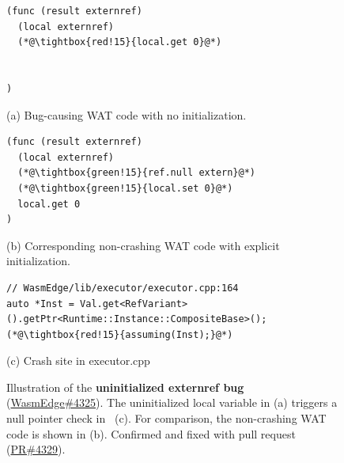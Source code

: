 \begin{figure}[t]
\centering
\begin{minipage}[t]{0.48\linewidth}
\lstset{style=watpaper}
\begin{lstlisting}
(func (result externref)
  (local externref)
  (*@\tightbox{red!15}{local.get 0}@*)

  
)
\end{lstlisting}
\centering\footnotesize{(a) Bug-causing WAT code with no  initialization.}
\end{minipage}\hfill
\begin{minipage}[t]{0.48\linewidth}
\lstset{style=watpaper}
\begin{lstlisting}
(func (result externref)
  (local externref)
  (*@\tightbox{green!15}{ref.null extern}@*)
  (*@\tightbox{green!15}{local.set 0}@*)
  local.get 0
)
\end{lstlisting}
\centering\footnotesize{(b) Corresponding non-crashing WAT code with explicit initialization.}
\end{minipage}

\vspace{6pt}

\begin{lstlisting}
// WasmEdge/lib/executor/executor.cpp:164
auto *Inst = Val.get<RefVariant>().getPtr<Runtime::Instance::CompositeBase>();
(*@\tightbox{red!15}{assuming(Inst);}@*)
\end{lstlisting}
\centering\footnotesize{(c) Crash site in executor.cpp}

\vspace{-4pt}
\caption{Illustration of the \textbf{uninitialized externref bug} (\href{https://github.com/WasmEdge/WasmEdge/issues/4325}{WasmEdge\#4325}). The uninitialized local variable in (a) triggers a null pointer check in \wasmedge~(c). For comparison, the non-crashing WAT code is shown in (b). Confirmed and fixed with pull request (\href{https://github.com/WasmEdge/WasmEdge/pull/4329}{PR\#4329}).
}
\label{ex:rq2_ex1}
\end{figure}
